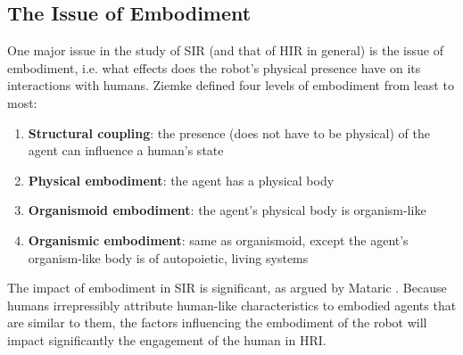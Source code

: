 \documentclass{ut-thesis}
\begin{document}
\subsection{The Issue of Embodiment}
One major issue in the study of SIR (and that of HIR in general) is the issue of embodiment, i.e. what effects does the robot's physical presence have on its interactions with humans.  Ziemke \cite{ziemke2001disentangling} defined four levels of embodiment from least to most:
\begin{enumerate}
	\item \textbf{Structural coupling}: the presence (does not have to be physical) of the agent can influence a human's state
	\item \textbf{Physical embodiment}: the agent has a physical body
	\item \textbf{Organismoid embodiment}: the agent's physical body is organism-like
	\item \textbf{Organismic embodiment}: same as organismoid, except the agent's organism-like body is of autopoietic, living systems
\end{enumerate}


The impact of embodiment in SIR is significant, as argued by Mataric \cite{mataric2005role}.  Because humans irrepressibly attribute human-like characteristics to embodied agents that are similar to them, the factors influencing the embodiment of the robot will impact significantly the engagement of the human in HRI.
\end{document}

